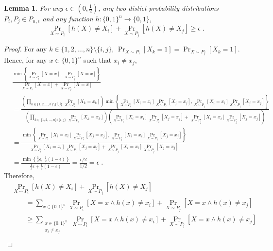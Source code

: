 \documentclass[12pt]{article}
\newtheorem{lemma}[proposition]{Lemma}
\begin{document}
\begin{lemma}
\label{lemma:projection-distances}
For any $\epsilon \in (0,\frac{1}{2})$,
any two distict probability distributions $P_i,P_j \in P_{n,\epsilon}$
and any function $h:\{0,1\}^n \to \{0,1\}$,
$$
\Pr_{X \sim P_i}[h(X) \neq X_i] + \Pr_{X \sim P_j}[h(X) \neq X_j] \ge \epsilon \; .
$$
\end{lemma}

\begin{proof}
For any $k \in \{1,2,\dots,n\} \setminus \{i,j\}$, $\Pr_{X \sim P_i}[X_k = 1] = \Pr_{X \sim P_j}[X_k = 1]$.
Hence, for any $x \in \{0,1\}^n$ such that $x_i \neq x_j$,
\begin{align*}
& \frac{\displaystyle \min \left\{ \Pr_{X \sim P_i}[X = x], \ \Pr_{X \sim P_j}[X = x] \right\}}{\displaystyle \Pr_{X \sim P_i}[X = x] + \Pr_{X \sim P_j}[X = x]} \\
& =  \frac{ \displaystyle
\left( \prod_{k \in \{1,2,\dots,n\} \setminus \{i,j\}} \Pr_{X \sim P_i}[X_k = x_k] \right) \min \left\{ \Pr_{X \sim P_i}[X_i = x_i] \Pr_{X \sim P_i}[X_j = x_j], \Pr_{X \sim P_j}[X_i = x_i] \Pr_{X \sim P_j}[X_j = x_j]  \right\}
}{ \displaystyle
\left( \prod_{k \in \{1,2,\dots,n\} \setminus \{i,j\}} \Pr_{X \sim P_i}[X_k = x_k] \right) \left( \Pr_{X \sim P_i}[X_i = x_i] \Pr_{X \sim P_i}[X_j = x_j] + \Pr_{X \sim P_j}[X_i = x_i] \Pr_{X \sim P_j}[X_j = x_j]  \right)
} \\
& = \frac{ \displaystyle \min \left\{ \Pr_{X \sim P_i}[X_i = x_i] \Pr_{X \sim P_i}[X_j = x_j], \Pr_{X \sim P_j}[X_i = x_i] \Pr_{X \sim P_j}[X_j = x_j]  \right\}
}{ \displaystyle \Pr_{X \sim P_i}[X_i = x_i] \Pr_{X \sim P_i}[X_j = x_j] + \Pr_{X \sim P_j}[X_i = x_i] \Pr_{X \sim P_j}[X_j = x_j] } \\
& = \frac{ \displaystyle \min \left\{ \frac{1}{2} \epsilon, \ \frac{1}{2} (1-\epsilon) \right\}
}{ \displaystyle \frac{1}{2} \epsilon + \frac{1}{2} (1-\epsilon) } = \frac{\epsilon/2}{1/2} = \epsilon \; .
\end{align*}
Therefore,
\begin{align*}
& \Pr_{X \sim P_i}[h(X) \neq X_i] + \Pr_{X \sim P_j}[h(X) \neq X_j] \\
& \qquad = \sum_{x \in \{0,1\}^n} \Pr_{X \sim P_i}[X = x \wedge h(x) \neq x_i] + \Pr_{X \sim P_j}[X = x \wedge h(x) \neq x_j] \\
& \qquad \ge \sum_{\substack{x \in \{0,1\}^n \\ x_i \neq x_j}} \Pr_{X \sim P_i}[X = x \wedge h(x) \neq x_i] + \Pr_{X \sim P_j}[X = x \wedge h(x) \neq x_j] \\

\end{align*}
\end{proof}
\end{document}
